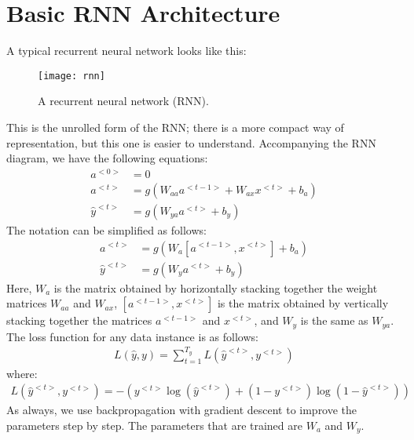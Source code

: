 \documentclass[a4paper, 12pt]{report}
\begin{document}
\section{Basic RNN Architecture}
A typical recurrent neural network looks like this:
\begin{figure}[H]
\centering
\texttt{[image: rnn]}
\caption{A recurrent neural network (RNN).}
\end{figure}
This is the unrolled form of the RNN; there is a more compact way of representation, but this one is easier to understand. Accompanying the RNN diagram, we have the following equations:
\begin{align*}
a^{<0>} &= 0\\
a^{<t>} &= g\left(W_{aa}a^{<t-1>}+W_{ax}x^{<t>}+b_{a}\right)\\
\hat{y}^{<t>} &= g\left(W_{ya}a^{<t>}+b_{y}\right)
\end{align*}
The notation can be simplified as follows:
\begin{align*}
a^{<t>} &= g\left(W_{a}\left[a^{<t-1>}, x^{<t>}\right]+b_{a}\right)\\
\hat{y}^{<t>} &= g\left(W_{y}a^{<t>}+b_{y}\right)
\end{align*}
Here, $W_{a}$ is the matrix obtained by horizontally stacking together the weight matrices $W_{aa}$ and $W_{ax}$, $\left[a^{<t-1>}, x^{<t>}\right]$ is the matrix obtained by vertically stacking together the matrices $a^{<t-1>}$ and $x^{<t>}$, and $W_{y}$ is the same as $W_{ya}$.\\
\break
The loss function for any data instance is as follows:
\begin{align*}
L(\hat{y}, y) = \sum_{t=1}^{T_y}L(\hat{y}^{<t>}, y^{<t>})
\end{align*}
where:
\begin{align*}
L(\hat{y}^{<t>}, y^{<t>}) = -\left(y^{<t>}\log\left(\hat{y}^{<t>}\right) + (1-y^{<t>})\log\left(1-\hat{y}^{<t>}\right)\right)
\end{align*}
As always, we use backpropagation with gradient descent to improve the parameters step by step. The parameters that are trained are $W_a$ and $W_y$.
\end{document}

